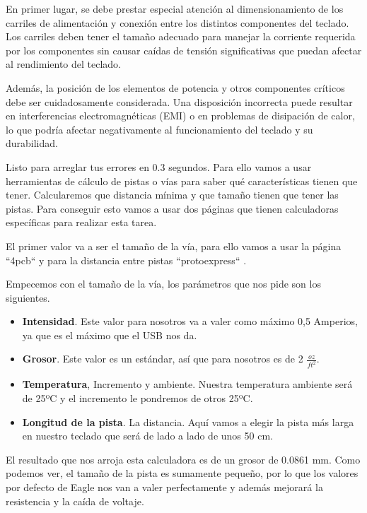 En primer lugar, se debe prestar especial atención al dimensionamiento de los carriles de alimentación y conexión entre los distintos componentes del teclado. Los carriles deben tener el tamaño adecuado para manejar la corriente requerida por los componentes sin causar caídas de tensión significativas que puedan afectar al rendimiento del teclado.

Además, la posición de los elementos de potencia y otros componentes críticos debe ser cuidadosamente considerada. Una disposición incorrecta puede resultar en interferencias electromagnéticas (EMI) o en problemas de disipación de calor, lo que podría afectar negativamente al funcionamiento del teclado y su durabilidad.

Listo para arreglar tus errores en 0.3 segundos. Para ello vamos a usar herramientas de cálculo de pistas o vías para saber qué características tienen que tener. Calcularemos que distancia mínima y que tamaño tienen que tener las pistas. Para conseguir esto vamos a usar dos páginas que tienen calculadoras específicas para realizar esta tarea.

El primer valor va a ser el tamaño de la vía, para ello vamos a usar la página ``4pcb`` \cite{4pcbCalculator} y para la distancia entre pistas ``protoexpress`` \cite{protoexpressCalculator}. 

Empecemos con el tamaño de la vía, los parámetros que nos pide son los siguientes.
\begin{itemize}
    \item \textbf{Intensidad}. Este valor para nosotros va a valer como máximo 0,5 Amperios, ya que es el máximo que el \gls{USB} nos da.
    \item \textbf{Grosor}. Este valor es un estándar, así que para nosotros es de 2 $\frac{oz}{ft^2}$.
    \item \textbf{Temperatura}, Incremento y ambiente. Nuestra temperatura ambiente será de 25ºC y el incremento le pondremos de otros 25ºC.
    \item \textbf{Longitud de la pista}. La distancia. Aquí vamos a elegir la pista más larga en nuestro teclado que será de lado a lado de unos 50 cm.
\end{itemize}

El resultado que nos arroja esta calculadora es de un grosor de 0.0861 mm. Como podemos ver, el tamaño de la pista es sumamente pequeño, por lo que los valores por defecto de Eagle nos van a valer perfectamente y además mejorará la resistencia y la caída de voltaje.

